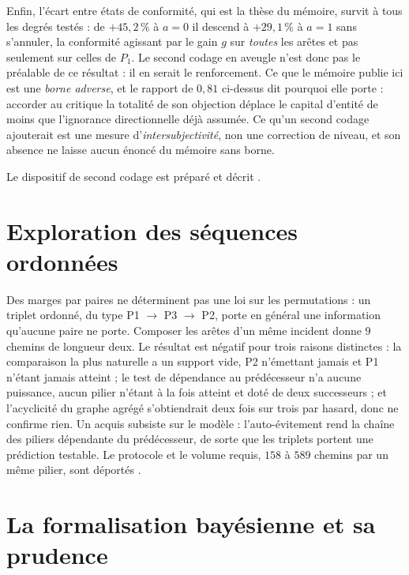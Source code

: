 Enfin, l'écart entre états de conformité, qui est la thèse du mémoire, survit à tous les degrés
testés : de $+45{,}2\,\%$ à $a=0$ il descend à $+29{,}1\,\%$ à $a=1$ sans s'annuler, la
conformité agissant par le gain $g$ sur \emph{toutes} les arêtes et pas seulement sur celles de
$P_1$. Le second codage en aveugle n'est donc pas le préalable de ce
résultat : il en serait le renforcement.
Ce que le mémoire publie ici est une
\emph{borne adverse}, et le rapport de $0{,}81$ ci-dessus dit pourquoi elle porte : accorder au
critique la totalité de son objection déplace le capital d'entité de moins que l'ignorance
directionnelle déjà assumée. Ce qu'un second codage ajouterait est une mesure
d'\emph{intersubjectivité}, non une correction de niveau, et son absence ne laisse aucun énoncé
du mémoire sans borne.

Le dispositif de second codage est préparé et décrit \matcomp.

\section{Exploration des séquences ordonnées}
\label{sec:sequences-ordonnees}

Des marges par paires ne déterminent pas une loi sur les permutations : un triplet ordonné,
du type P1 $\to$ P3 $\to$ P2, porte en général une information qu'aucune paire ne porte. Composer
les arêtes d'un même incident donne $9$ chemins de longueur deux. Le résultat est négatif pour
trois raisons distinctes : la comparaison la plus naturelle a un support vide, P2 n'émettant
jamais et P1 n'étant jamais atteint ; le test de dépendance au prédécesseur n'a aucune puissance,
aucun pilier n'étant à la fois atteint et doté de deux successeurs ; et l'acyclicité du graphe
agrégé s'obtiendrait deux fois sur trois par hasard, donc ne confirme rien. Un acquis subsiste
sur le modèle : l'auto-évitement rend la chaîne des piliers dépendante du prédécesseur, de sorte
que les triplets portent une prédiction testable. Le protocole et le volume requis, $158$ à
$589$ chemins par un même pilier, sont déportés \matcomp.


\section{La formalisation bayésienne et sa prudence}

